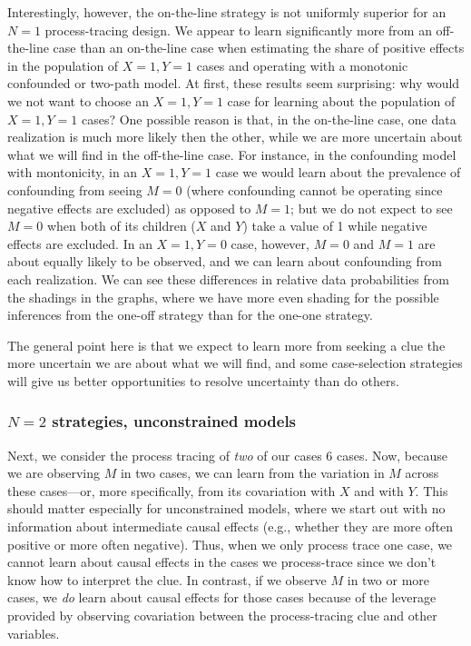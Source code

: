 \documentclass[
  12pt,
]{book}
\begin{document}
Interestingly, however, the on-the-line strategy is not uniformly superior for an \(N=1\) process-tracing design. We appear to learn significantly more from an off-the-line case than an on-the-line case when estimating the share of positive effects in the population of \(X=1, Y=1\) cases and operating with a monotonic confounded or two-path model. At first, these results seem surprising: why would we not want to choose an \(X=1, Y=1\) case for learning about the population of \(X=1, Y=1\) cases? One possible reason is that, in the on-the-line case, one data realization is much more likely then the other, while we are more uncertain about what we will find in the off-the-line case. For instance, in the confounding model with montonicity, in an \(X=1, Y=1\) case we would learn about the prevalence of confounding from seeing \(M=0\) (where confounding cannot be operating since negative effects are excluded) as opposed to \(M=1\); but we do not expect to see \(M=0\) when both of its children (\(X\) and \(Y\)) take a value of 1 while negative effects are excluded. In an \(X=1, Y=0\) case, however, \(M=0\) and \(M=1\) are about equally likely to be observed, and we can learn about confounding from each realization. We can see these differences in relative data probabilities from the shadings in the graphs, where we have more even shading for the possible inferences from the one-off strategy than for the one-one strategy.

The general point here is that we expect to learn more from seeking a clue the more uncertain we are about what we will find, and some case-selection strategies will give us better opportunities to resolve uncertainty than do others.

\hypertarget{n2-strategies-unconstrained-models}{%
\subsubsection{\texorpdfstring{\(N=2\) strategies, unconstrained models}{N=2 strategies, unconstrained models}}\label{n2-strategies-unconstrained-models}}

Next, we consider the process tracing of \emph{two} of our cases 6 cases. Now, because we are observing \(M\) in two cases, we can learn from the variation in \(M\) across these cases---or, more specifically, from its covariation with \(X\) and with \(Y\). This should matter especially for unconstrained models, where we start out with no information about intermediate causal effects (e.g., whether they are more often positive or more often negative). Thus, when we only process trace one case, we cannot learn about causal effects in the cases we process-trace since we don't know how to interpret the clue. In contrast, if we observe \(M\) in two or more cases, we \emph{do} learn about causal effects for those cases because of the leverage provided by observing covariation between the process-tracing clue and other variables.
\end{document}
